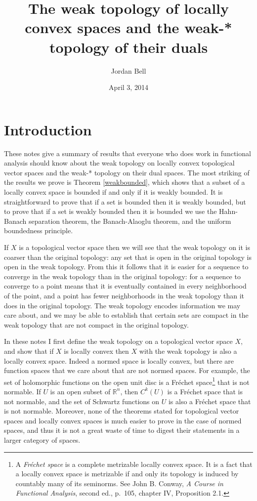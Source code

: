 \documentclass{article}
\begin{document}
\title{The weak topology of locally convex spaces and the weak-* topology of their duals}
\author{Jordan Bell}
\date{April 3, 2014}
\maketitle

\section{Introduction}
These notes  give a summary of results that everyone who does work in functional analysis should know
about the weak topology on locally convex topological vector spaces and the weak-* topology on their dual spaces.
The most striking of the results we prove is Theorem \ref{weakbounded}, which shows that
a subset of a locally convex space is bounded if and only if it is weakly bounded. It is straightforward to prove that if a set
is bounded then it is weakly bounded, but to prove that if a set is weakly bounded then it is bounded we use the Hahn-Banach separation
theorem, the Banach-Alaoglu theorem, and the uniform boundedness principle.

If $X$ is a topological vector space then we will see that the weak topology on it is coarser than the original topology: any set that is open in the original
topology is open in the weak topology. From this it follows that it is easier for a sequence to converge in the weak topology than in the original topology:
 for a sequence to converge to a point means
that it is eventually contained in every neighborhood of the point, and a point has fewer neighborhoods in the weak topology than it does in the original
topology. The weak topology encodes information we may care about, and we may be able to establish
that certain sets are compact in the weak topology that are not compact in the original topology.


In these notes I first define the weak topology on a topological vector space $X$, and show that if $X$ is locally convex then $X$ with the weak topology is also a locally convex space.
 Indeed
a normed space is locally convex, but there are function spaces that we care about that are not normed spaces. For example, the set of holomorphic functions
on the open unit disc is a Fr\'echet space\footnote{A {\em Fr\'echet space} is a complete metrizable locally convex space.
It is a fact that a locally convex
 space is metrizable if and only its topology is induced by countably many of its seminorms. See John B. Conway, {\em A Course
 in Functional Analysis}, second ed., p.~105, chapter IV, Proposition 2.1.}  that is not normable. If $U$ is an open subset of $\mathbb{R}^n$, then $C^k(U)$ is a Fr\'echet space that is not normable, and the set of Schwartz functions on $U$ is also
a Fr\'echet space that is not normable. Moreover, none of the theorems stated for topological vector spaces and locally convex spaces is much easier to prove
in the case of normed spaces, and thus it is not a great waste of time to digest their statements in a larger category
of spaces.
\end{document}

